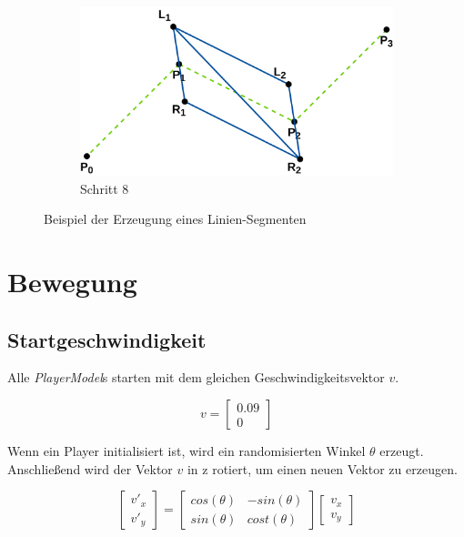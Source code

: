 \documentclass[doktyp=studarbeit]{TUBAFarbeiten}
\begin{document}
\begin{figure}[!htb]
\begin{subfigure}[b]{0.35\textwidth}
        \includegraphics[width=1\linewidth]{Schlangenlinie-8.png}
        \caption{Schritt 8}
    \end{subfigure}
    \caption{Beispiel der Erzeugung eines Linien-Segmenten}
	\label{fig:line}
\end{figure}

\section{Bewegung}

\subsection{Startgeschwindigkeit}

Alle \textit{PlayerModel}s starten mit dem gleichen 
Geschwindigkeitsvektor $v$.

\begin{equation}
    v =
    \begin{bmatrix}
        0.09    \\
        0
    \end{bmatrix}
\end{equation}

Wenn ein Player initialisiert ist, wird ein randomisierten Winkel $\theta$ 
erzeugt. Anschließend wird der Vektor $v$ in z rotiert, um einen neuen Vektor zu 
erzeugen.

\begin{equation}
    \begin{bmatrix}
        v'_{x} \\
        v'_{y}     
    \end{bmatrix}
    =
    \begin{bmatrix}
        cos(\theta) & -sin(\theta) \\
        sin(\theta) & cost(\theta)
    \end{bmatrix}
    \begin{bmatrix}
        v_{x} \\
        v_{y}
    \end{bmatrix}
    \label{eq:rotation}
\end{equation}
\end{document}
